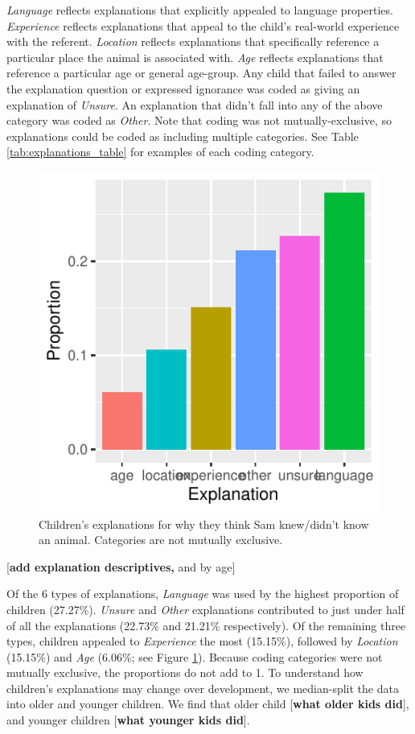 \documentclass[10pt, letterpaper]{article}
\newenvironment{CodeChunk}{}{}
\begin{document}
\emph{Language} reflects explanations that explicitly appealed to
language properties. \emph{Experience} reflects explanations that appeal
to the child's real-world experience with the referent. \emph{Location}
reflects explanations that specifically reference a particular place the
animal is associated with. \emph{Age} reflects explanations that
reference a particular age or general age-group. Any child that failed
to answer the explanation question or expressed ignorance was coded as
giving an explanation of \emph{Unsure}. An explanation that didn't fall
into any of the above category was coded as \emph{Other}. Note that
coding was not mutually-exclusive, so explanations could be coded as
including multiple categories. See Table \ref{tab:explanations_table}
for examples of each coding category.

\begin{CodeChunk}
\begin{figure}[tb]
\includegraphics{figs/explanations-1} \caption[Children's explanations for why they think Sam knew/didn't know an animal]{Children's explanations for why they think Sam knew/didn't know an animal. Categories are not mutually exclusive.}\label{fig:explanations}
\end{figure}
\end{CodeChunk}

{[}\textbf{add explanation descriptives,} and by age{]}

Of the 6 types of explanations, \emph{Language} was used by the highest
proportion of children (27.27\%). \emph{Unsure} and \emph{Other}
explanations contributed to just under half of all the explanations
(22.73\% and 21.21\% respectively). Of the remaining three types,
children appealed to \emph{Experience} the most (15.15\%), followed by
\emph{Location} (15.15\%) and \emph{Age} (6.06\%; see Figure
\ref{fig:explanations}). Because coding categories were not mutually
exclusive, the proportions do not add to 1. To understand how children's
explanations may change over development, we median-split the data into
older and younger children. We find that older child {[}\textbf{what
older kids did}{]}, and younger children {[}\textbf{what younger kids
did}{]}.
\end{document}
